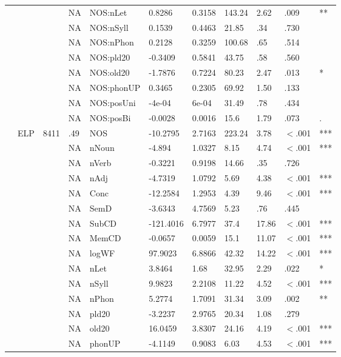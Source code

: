 \begin{table}[ht]
\begin{tabular}{lllllllllll}
   &  &  & NA & NOS:nLet & 0.8286 & 0.3158 & 143.24 & 2.62 & .009 & ** \\ 
   &  &  & NA & NOS:nSyll & 0.1539 & 0.4463 & 21.85 & .34 & .730 &   \\ 
   &  &  & NA & NOS:nPhon & 0.2128 & 0.3259 & 100.68 & .65 & .514 &   \\ 
   &  &  & NA & NOS:pld20 & -0.3409 & 0.5841 & 43.75 & .58 & .560 &   \\ 
   &  &  & NA & NOS:old20 & -1.7876 & 0.7224 & 80.23 & 2.47 & .013 & * \\ 
   &  &  & NA & NOS:phonUP & 0.3465 & 0.2305 & 69.92 & 1.50 & .133 &   \\ 
   &  &  & NA & NOS:posUni & -4e-04 & 6e-04 & 31.49 & .78 & .434 &   \\ 
   &  &  & NA & NOS:posBi & -0.0028 & 0.0016 & 15.6 & 1.79 & .073 & . \\ 
   & ELP & 8411 & .49 & NOS & -10.2795 & 2.7163 & 223.24 & 3.78 & $<$.001 & *** \\ 
   &  &  & NA & nNoun & -4.894 & 1.0327 & 8.15 & 4.74 & $<$.001 & *** \\ 
   &  &  & NA & nVerb & -0.3221 & 0.9198 & 14.66 & .35 & .726 &   \\ 
   &  &  & NA & nAdj & -4.7319 & 1.0792 & 5.69 & 4.38 & $<$.001 & *** \\ 
   &  &  & NA & Conc & -12.2584 & 1.2953 & 4.39 & 9.46 & $<$.001 & *** \\ 
   &  &  & NA & SemD & -3.6343 & 4.7569 & 5.23 & .76 & .445 &   \\ 
   &  &  & NA & SubCD & -121.4016 & 6.7977 & 37.4 & 17.86 & $<$.001 & *** \\ 
   &  &  & NA & MemCD & -0.0657 & 0.0059 & 15.1 & 11.07 & $<$.001 & *** \\ 
   &  &  & NA & logWF & 97.9023 & 6.8866 & 42.32 & 14.22 & $<$.001 & *** \\ 
   &  &  & NA & nLet & 3.8464 & 1.68 & 32.95 & 2.29 & .022 & * \\ 
   &  &  & NA & nSyll & 9.9823 & 2.2108 & 11.22 & 4.52 & $<$.001 & *** \\ 
   &  &  & NA & nPhon & 5.2774 & 1.7091 & 31.34 & 3.09 & .002 & ** \\ 
   &  &  & NA & pld20 & -3.2237 & 2.9765 & 20.34 & 1.08 & .279 &   \\ 
   &  &  & NA & old20 & 16.0459 & 3.8307 & 24.16 & 4.19 & $<$.001 & *** \\ 
   &  &  & NA & phonUP & -4.1149 & 0.9083 & 6.03 & 4.53 & $<$.001 & *** \\ 

\end{tabular}
\end{table}
